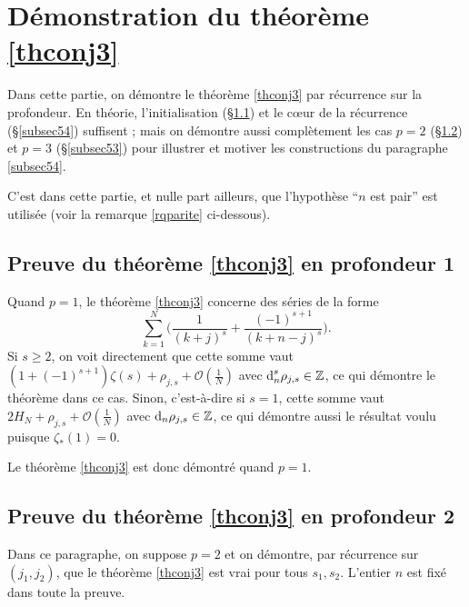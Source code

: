 \documentclass[12pt,francais, reqno]{smfart}
\numberwithin{equation}{section}
\newcommand{\dd}{\textup{d}}
\def\dd{\textup{d}}
\newcommand{\Z}{\mathbb Z}
\newcommand{\gdo}{\mathcal{O}}
\newcommand{\zetaetoile}{\zeta _*}
\begin{document}
\section{D\'emonstration du th\'eor\`eme \ref{thconj3}  } \label{sec5}

Dans cette partie, on d\'emontre le  th\'eor\`eme \ref{thconj3}  par r\'ecurrence sur la profondeur. En th\'eorie, l'initialisation (\S \ref{subsec51}) et le c\oe ur de la r\'ecurrence (\S \ref{subsec54}) suffisent ; mais on d\'emontre aussi compl\`etement les cas $p=2$ (\S \ref{subsec52}) et $p=3$ (\S \ref{subsec53}) pour illustrer et motiver les constructions du paragraphe \ref{subsec54}.

C'est dans cette partie, et nulle part ailleurs, que l'hypoth\`ese ``$n$ est pair'' est utilis\'ee (voir la remarque \ref{rqparite} ci-dessous). 

\subsection{Preuve du th\'eor\`eme \ref{thconj3}  en profondeur 1} \label{subsec51}

Quand $p=1$, le th\'eor\`eme \ref{thconj3} concerne des s\'eries de la forme 
$$\sum_{k=1} ^N \Big(  \frac{1}{(k+j)^s} + \frac{(-1)^{s+1}}{(k+n-j)^s} \Big).$$
Si $s \geq 2$, on voit directement que cette somme vaut $(1+(-1)^{s+1}) \zeta(s) + \rho_{j,s} + \gdo(\frac{1}{N})$ avec $\dd_n^s \rho_{j,s} \in \Z$, ce qui d\'emontre le th\'eor\`eme dans ce cas. Sinon, c'est-\`a-dire si $s=1$, cette somme vaut $2 H_N  +   \rho_{j,s} + \gdo(\frac{1}{N})$ avec $\dd_n \rho_{j,s} \in \Z$, ce qui d\'emontre aussi le r\'esultat voulu puisque $\zetaetoile(1)=0$.

Le th\'eor\`eme \ref{thconj3}  est donc d\'emontr\'e quand $p=1$.

\subsection{Preuve du th\'eor\`eme \ref{thconj3}  en profondeur 2} \label{subsec52}

Dans ce paragraphe, on suppose $p=2$ et on d\'emontre, par r\'ecurrence sur $(j_1,j_2)$, que le th\'eor\`eme \ref{thconj3}  est vrai pour tous $s_1, s_2$. L'entier  $n$ est fix\'e dans toute la preuve. 

\smallskip
\end{document}
